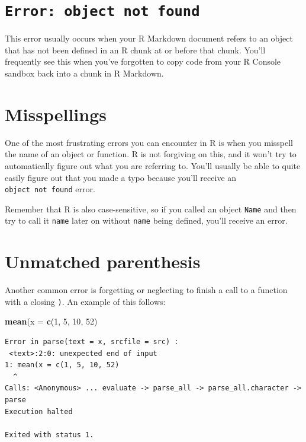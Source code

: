 \documentclass[]{tufte-book}
\newenvironment{Shaded}{\begin{snugshade}}{\end{snugshade}}
\newcommand{\AttributeTok}[1]{\textcolor[rgb]{0.13,0.29,0.53}{#1}}
\newcommand{\DecValTok}[1]{\textcolor[rgb]{0.00,0.00,0.81}{#1}}
\newcommand{\FunctionTok}[1]{\textcolor[rgb]{0.13,0.29,0.53}{\textbf{#1}}}
\newcommand{\NormalTok}[1]{#1}
\begin{document}
\section{\texorpdfstring{\texttt{Error:\ object\ not\ found}}{Error: object not found}}\label{error-object-not-found}

This error usually occurs when your R Markdown document refers to an object that has not been defined in an R chunk at or before that chunk. You'll frequently see this when you've forgotten to copy code from your R Console sandbox back into a chunk in R Markdown.

\section{Misspellings}\label{misspellings}

One of the most frustrating errors you can encounter in R is when you misspell the name of an object or function. R is not forgiving on this, and it won't try to automatically figure out what you are referring to. You'll usually be able to quite easily figure out that you made a typo because you'll receive an \texttt{object\ not\ found} error.

Remember that R is also case-sensitive, so if you called an object \texttt{Name} and then try to call it \texttt{name} later on without \texttt{name} being defined, you'll receive an error.

\section{Unmatched parenthesis}\label{unmatched-parenthesis}

Another common error is forgetting or neglecting to finish a call to a function with a closing \texttt{)}. An example of this follows:

\begin{Shaded}
\begin{Highlighting}[]
\FunctionTok{mean}\NormalTok{(}\AttributeTok{x =} \FunctionTok{c}\NormalTok{(}\DecValTok{1}\NormalTok{, }\DecValTok{5}\NormalTok{, }\DecValTok{10}\NormalTok{, }\DecValTok{52}\NormalTok{)}
\end{Highlighting}
\end{Shaded}

\begin{verbatim}
Error in parse(text = x, srcfile = src) :
 <text>:2:0: unexpected end of input
1: mean(x = c(1, 5, 10, 52)
  ^
Calls: <Anonymous> ... evaluate -> parse_all -> parse_all.character -> parse
Execution halted

Exited with status 1.
\end{verbatim}
\end{document}
